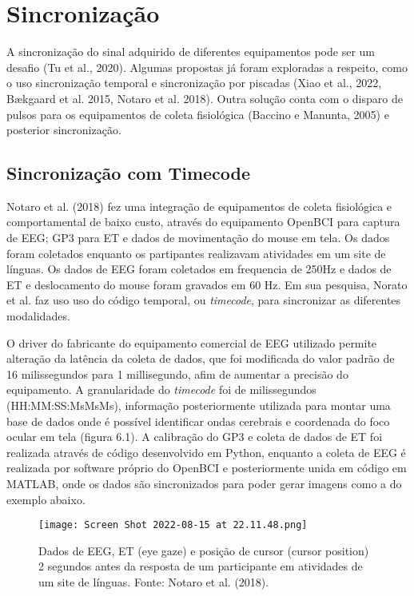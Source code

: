 \chapter{Sincronização}

A sincronização do sinal adquirido de diferentes equipamentos pode ser um desafio 
(Tu et al., 2020). Algumas propostas já foram exploradas a respeito, 
como o uso sincronização temporal e sincronização por piscadas (Xiao et al., 2022, 
Bækgaard et al. 2015, Notaro et al. 2018). Outra solução
conta com o disparo de pulsos para os equipamentos de coleta fisiológica 
(Baccino e Manunta, 2005) e posterior sincronização. 


\section{Sincronização com Timecode}
Notaro et al. (2018) fez uma integração de equipamentos de coleta fisiológica e comportamental de 
baixo custo, através do equipamento OpenBCI para captura de EEG; GP3 para ET e dados 
de movimentação do mouse em tela. Os dados foram coletados enquanto os partipantes realizavam atividades em um 
site de línguas. Os dados de EEG foram coletados em frequencia de 250Hz e dados de ET e deslocamento
do mouse foram gravados em 60 Hz. Em sua pesquisa, Norato et al.  faz uso uso do código temporal, ou \textit{timecode}, 
para sincronizar as diferentes modalidades. 

O driver do fabricante do equipamento 
comercial de EEG utilizado permite alteração da latência da coleta de dados, que
foi modificada do valor padrão de 16 milissegundos para 1 millisegundo, afim de aumentar a precisão do 
equipamento. A granularidade do \textit{timecode} foi de milissegundos (HH:MM:SS:MsMsMs), informação posteriormente utilizada
para montar uma base de dados onde é possível identificar ondas cerebrais e coordenada do foco ocular em tela (figura 6.1). 
A calibração do GP3 e coleta de dados de ET foi realizada através de código desenvolvido em Python, enquanto a
coleta de EEG é realizada por software próprio do OpenBCI e posteriormente unida em código em MATLAB, onde os dados são
sincronizados para poder gerar imagens como a do exemplo abaixo. 


\begin{figure}[!h]
    \centering
    \texttt{[image: Screen Shot 2022-08-15 at 22.11.48.png]}
    \caption{Dados de EEG, ET (eye gaze) e posição de cursor (cursor position) 2 segundos antes da resposta de um participante em atividades de um site de línguas. 
    Fonte: Notaro et al. (2018).}
\end{figure}

